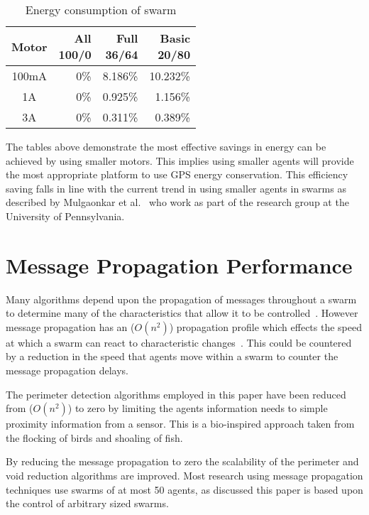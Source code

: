 \documentclass{ieeeaccess}
\begin{document}
\begin{table}
\begin{center}
\begin{tabular}{| c | r | r | r |}
\hline
{\parbox{1.5cm}{\centering Motor}} & {\parbox{1cm}{\centering All\\100/0}} & {\parbox{1,5cm}{\centering Full\\36/64}} & {\parbox{1.5cm}{\centering Basic \\20/80}} \\ \hline
100mA & 0\% & 8.186\% & 10.232\% \\ \hline
1A    & 0\% & 0.925\% &  1.156\% \\ \hline
3A    & 0\% & 0.311\% &  0.389\% \\ \hline
\end{tabular}\caption{Energy consumption of swarm} \label{tab:Energy3}
\end{center}
\end{table}

The tables above demonstrate the most effective savings in energy can be achieved by using smaller motors. This implies using smaller agents will provide the most appropriate platform to use GPS energy conservation. This efficiency saving falls in line with the current trend in using smaller agents in swarms as described by Mulgaonkar et al.~\cite{KV:16,MCK:15} who work as part of the research group at the University of Pennsylvania.

\section{Message Propagation Performance}\label{methods:MessagePropogation}
Many algorithms depend upon the propagation of messages throughout a swarm to determine many of the characteristics that allow it to be controlled~\cite{MD:09}. However message propagation has an ($O(n^2)$) propagation profile which effects the speed at which a swarm can react to characteristic changes~\cite{SHA:07}. This could be countered by a reduction in the speed that agents move within a swarm to counter the message propagation delays. 

The perimeter detection algorithms employed in this paper have been reduced from ($O(n^2)$) to zero by limiting the agents information needs to simple proximity information from a sensor. This is a bio-inspired approach taken from the flocking of birds and shoaling of fish.

By reducing the message propagation to zero the scalability of the perimeter and void reduction algorithms are improved. Most research using message propagation techniques use swarms of at most 50 agents, as discussed this paper is based upon the control of arbitrary sized swarms.
\end{document}
